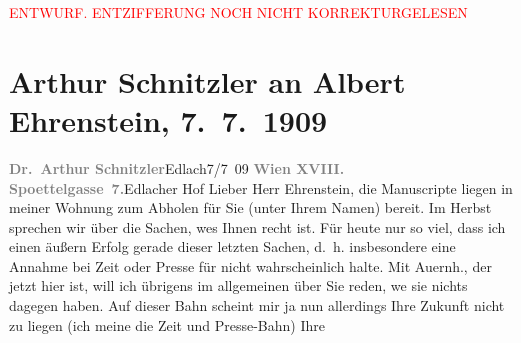 
\begin{center}
            \textcolor{red}{ENTWURF. ENTZIFFERUNG NOCH NICHT KORREKTURGELESEN}
                      \end{center}
            
               \section[Arthur Schnitzler an Albert Ehrenstein, 7. 7. 1909]{ Arthur Schnitzler an Albert Ehrenstein, 7. 7. 1909}\nopagebreak{}\rehead{ }\begin{ledgroupsized}[t]{13cm}\normalsize\beginnumbering{} \toendnotes[C]{\smallbreak\pagebreak[2]} 
\pstart
           \noindent{}{\pb}\textcolor{gray}{\textbf{Dr. Arthur Schnitzler}}\hfill Edlach7/7 09\pend
           \pstart
           \textcolor{gray}{\textbf{Wien XVIII.
                            Spoettelgasse 7.}}\hfill Edlacher Hof\pend
           \pstart{}Lieber Herr Ehrenstein,\pend\pstart
           die Manuscripte liegen in meiner Wohnung zum Abholen für Sie (unter Ihrem Namen)
                    bereit.\pend
           \pstart
           Im Herbst sprechen wir über die Sachen, we{\geminationn}s Ihnen
                    recht ist. Für heute nur so viel, {\pb}dass ich einen äußern
                    Erfolg gerade dieser letzten Sachen, d. h. insbesondere eine Annahme bei
                        Zeit oder Presse für nicht wahrscheinlich halte. Mit Auernh., der jetzt hier ist, will ich übrigens im
                    allgemeinen über Sie reden, we{\geminationn}
               sie nichts dagegen
                    haben. Auf dieser Bahn scheint mir ja nun {\pb}allerdings
                    Ihre Zukunft nicht zu liegen (ich meine die Zeit und Presse-Bahn) Ihre

\end{ledgroupsized}
